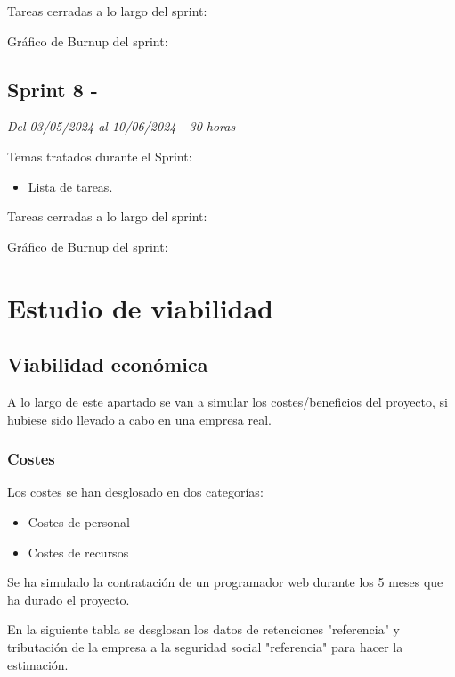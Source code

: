 Tareas cerradas a lo largo del sprint:

Gráfico de Burnup del sprint:


\subsection{Sprint 8 - }
\textit{Del 03/05/2024 al 10/06/2024 - 30 horas}

Temas tratados durante el Sprint:
\begin{itemize}
	\item
	Lista de tareas.
\end{itemize}

Tareas cerradas a lo largo del sprint:

Gráfico de Burnup del sprint:

\section{Estudio de viabilidad}

\subsection{Viabilidad económica}

A lo largo de este apartado se van a simular los costes/beneficios del proyecto, si hubiese sido llevado a cabo en una empresa real.

\subsubsection{Costes}
Los costes se han desglosado en dos categorías:
\begin{itemize}
	\item	Costes de personal
	\item	Costes de recursos
\end{itemize}

Se ha simulado la contratación de un programador web durante los 5 meses que ha durado el proyecto.

En la siguiente tabla se desglosan los datos de retenciones "referencia" y tributación de la empresa a la seguridad social "referencia" para hacer la estimación.

